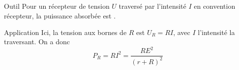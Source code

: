 \documentclass[a4paper, 12pt, final, garamond]{book}
\begin{document}
\subsection{}
\begin{tcbraster}[raster columns=2, raster equal height=rows]
    \begin{NCrapp}{Outil}
        Pour un récepteur de tension $U$ traversé par l'intensité $I$ en
        convention récepteur, la puissance absorbée est .
    \end{NCrapp}
    \begin{NCexem}{Application}
        Ici, la tension aux bornes de $R$ est $U_R = RI$, avec $I$ l'intensité
        la traversant. On a donc
        \begin{equation*}
            \boxed{P_R = RI^2 = \frac{RE^2}{(r+R)^2}}
        \end{equation*}
    \end{NCexem}
\end{tcbraster}
\end{document}
